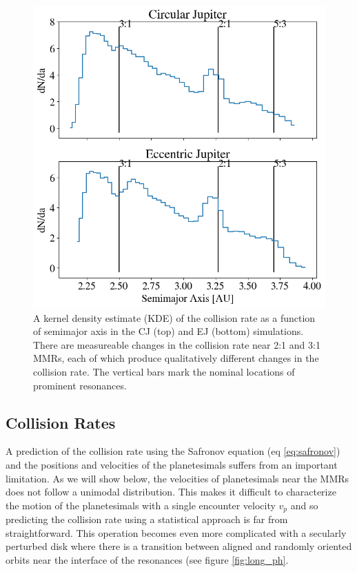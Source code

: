 \documentclass[onecolumn]{aastex63}
\begin{document}
\begin{figure}
    \begin{center}
    \includegraphics[width=0.4\columnwidth]{figures/coll_hist_a.png}
    \caption{A kernel density estimate (KDE) of the collision rate as a function of semimajor axis in the CJ (top) and EJ (bottom) simulations. 
    There are measureable changes in the collision rate near 2:1 and 3:1 MMRs, each of which produce qualitatively different changes in the 
    collision rate. The vertical bars mark the nominal locations of prominent resonances.\label{fig:coll_hist_a}}
    \end{center}
\end{figure}

\subsection{Collision Rates}\label{sec:coll_rates}

A prediction of the collision rate using the Safronov equation (eq \ref{eq:safronov}) and the positions and velocities of the planetesimals
suffers from an important limitation. As we will show below, the velocities of planetesimals near the MMRs does not follow a unimodal 
distribution. This makes it difficult to characterize the motion of the planetesimals with a single encounter velocity $v_{p}$ and so predicting 
the collision rate using a statistical approach is far from straightforward. This operation becomes even more complicated with a secularly 
perturbed disk where there is a transition between aligned and randomly oriented orbits near the interface of the resonances (see figure 
\ref{fig:long_ph}.
\end{document}

